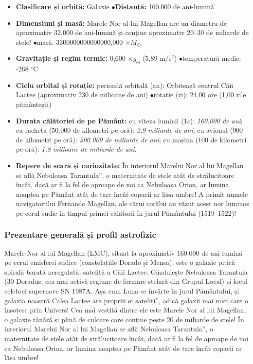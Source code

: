 \begin{tcolorbox}[orbitardata, title={\textbf{Repere esențiale: Marele Nor al lui Magellan}}]
\small
\begin{itemize}[leftmargin=1.4em, itemsep=2pt, topsep=2pt]
  \item \textbf{Clasificare și orbită:} Galaxie \quad$\bullet$\quad \textbf{Distanță:} 160.000 de ani-lumină
  \item \textbf{Dimensiuni și masă:} Marele Nor al lui Magellan are un diametru de aproximativ 32.000 de ani-lumină și conține aproximativ 20--30 de miliarde de stele! \quad$\bullet$\quad masă: 3300000000000000,000 $\times M_\oplus$
  \item \textbf{Gravitație și regim termic:} 0,600 $\times g_\oplus$ (5,89 m/s$^2$) \quad$\bullet$\quad temperatură medie: -268 $^\circ$C
  \item \textbf{Ciclu orbital și rotație:} perioadă orbitală (an): Orbitează centrul Căii Lactee (aproximativ 230 de milioane de ani) \quad$\bullet$\quad rotație (zi): 24,00 ore (1,00 zile pământești)
  \item \textbf{Durata călătoriei de pe Pământ:} cu viteza luminii ($1c$): \emph{160.000 de ani}; cu racheta ($50.000$ de kilometri pe oră): \emph{2,9 miliarde de ani}; cu avionul ($900$ de kilometri pe oră): \emph{200.000 de miliarde de ani}; cu mașina ($100$ de kilometri pe oră): \emph{1,8 milioane de miliarde de ani}.
  \item \textbf{Repere de scară și curiozitate:} În interiorul Marelui Nor al lui Magellan se află \quotedblbase{}Nebuloasa Tarantula\textquotedblright{}, o maternitate de stele atât de strălucitoare încât, dacă ar fi la fel de aproape de noi ca Nebuloasa Orion, ar lumina noaptea pe Pământ atât de tare încât copacii ar lăsa umbre! A primit numele navigatorului Fernando Magellan, ale cărui corăbii au văzut acest nor luminos pe cerul sudic în timpul primei călătorii în jurul Pământului (1519--1522)!
\end{itemize}
\end{tcolorbox}

\subsubsection*{Prezentare generală și profil astrofizic}
Marele Nor al lui Magellan (LMC), situat la aproximativ 160.000 de ani-lumină pe cerul emisferei sudice (constelațiile Dorado și Mensa), este o galaxie pitică spirală barată neregulată, satelită a Căii Lactee. Găzduiește Nebuloasa Tarantula (30 Doradus, cea mai activă regiune de formare stelară din Grupul Local) și locul celebrei supernove SN 1987A. Așa cum Luna se învârte în jurul Pământului, și galaxia noastră Calea Lactee are propriii ei \quotedblbase{}sateliți\textquotedblright{}, adică galaxii mai mici care o însoțesc prin Univers! Cea mai vestită dintre ele este Marele Nor al lui Magellan, o galaxie tânără și plină de culoare care conține peste 20 de miliarde de stele! În interiorul Marelui Nor al lui Magellan se află \quotedblbase{}Nebuloasa Tarantula\textquotedblright{}, o maternitate de stele atât de strălucitoare încât, dacă ar fi la fel de aproape de noi ca Nebuloasa Orion, ar lumina noaptea pe Pământ atât de tare încât copacii ar lăsa umbre!

